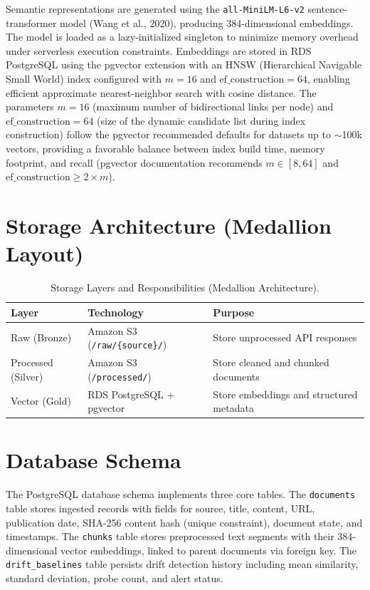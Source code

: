 Semantic representations are generated using the \texttt{all-MiniLM-L6-v2} sentence-transformer model (Wang et al., 2020), producing 384-dimensional embeddings. The model is loaded as a lazy-initialized singleton to minimize memory overhead under serverless execution constraints. Embeddings are stored in RDS PostgreSQL using the pgvector extension with an HNSW (Hierarchical Navigable Small World) index configured with $m = 16$ and $\text{ef\_construction} = 64$, enabling efficient approximate nearest-neighbor search with cosine distance. The parameters $m = 16$ (maximum number of bidirectional links per node) and $\text{ef\_construction} = 64$ (size of the dynamic candidate list during index construction) follow the pgvector recommended defaults for datasets up to $\sim$100k vectors, providing a favorable balance between index build time, memory footprint, and recall (pgvector documentation recommends $m \in [8, 64]$ and $\text{ef\_construction} \geq 2 \times m$).

\section{Storage Architecture (Medallion Layout)}
\label{sec:storage}

\begin{table}[H]
\caption{Storage Layers and Responsibilities (Medallion Architecture).}
\label{tab:storage_layers}
\centering
\begin{tabular}{p{2.8cm}p{5.8cm}p{4.0cm}}
\toprule
\textbf{Layer} & \textbf{Technology} & \textbf{Purpose} \\
\midrule
Raw (Bronze) & Amazon S3 (\texttt{/raw/\{source\}/}) & Store unprocessed API responses \\
Processed (Silver) & Amazon S3 (\texttt{/processed/}) & Store cleaned and chunked documents \\
Vector (Gold) & RDS PostgreSQL + pgvector & Store embeddings and structured metadata \\
\bottomrule
\end{tabular}
\end{table}

\section{Database Schema}
\label{sec:schema}

The PostgreSQL database schema implements three core tables. The \texttt{documents} table stores ingested records with fields for source, title, content, URL, publication date, SHA-256 content hash (unique constraint), document state, and timestamps. The \texttt{chunks} table stores preprocessed text segments with their 384-dimensional vector embeddings, linked to parent documents via foreign key. The \texttt{drift\_baselines} table persists drift detection history including mean similarity, standard deviation, probe count, and alert status.

